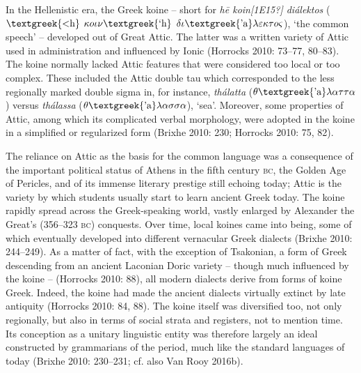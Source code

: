 \begin{styleStandard}
In the Hellenistic era, the Greek koine – short for \textit{h\=e koin[1E15?] diálektos} ($\text{\textgreek{<h}}$ $\kappa o\iota \nu \text{\textgreek{`h}}$ $\delta \iota \text{\textgreek{'a}}\lambda \varepsilon \kappa \tau o\varsigma $), ‘the common speech’ – developed out of Great Attic. The latter was a written variety of Attic used in administration and influenced by Ionic (Horrocks 2010: 73–77, 80–83). The koine normally lacked Attic features that were considered too local or too complex. These included the Attic double tau which corresponded to the less regionally marked double sigma in, for instance, \textit{thálatta }($\theta \text{\textgreek{'a}}\lambda \alpha \tau \tau \alpha $) versus \textit{thálassa }($\theta \text{\textgreek{'a}}\lambda \alpha \sigma \sigma \alpha $), ‘sea’. Moreover, some properties of Attic, among which its complicated verbal morphology, were adopted in the koine in a simplified or regularized form (Brixhe 2010: 230; Horrocks 2010: 75, 82).
\end{styleStandard}

\begin{styleStandard}
The reliance on Attic as the basis for the common language was a consequence of the important political status of Athens in the fifth century \textsc{bc}, the Golden Age of Pericles, and of its immense literary prestige still echoing today; Attic is the variety by which students usually start to learn ancient Greek today. The koine rapidly spread across the Greek-speaking world, vastly enlarged by Alexander the Great’s (356–323 \textsc{bc}) conquests. Over time, local koines came into being, some of which eventually developed into different vernacular Greek dialects (Brixhe 2010: 244–249). As a matter of fact, with the exception of Tsakonian, a form of Greek descending from an ancient Laconian Doric variety – though much influenced by the koine – (Horrocks 2010: 88), all modern dialects derive from forms of koine Greek. Indeed, the koine had made the ancient dialects virtually extinct by late antiquity (Horrocks 2010: 84, 88). The koine itself was diversified too, not only regionally, but also in terms of social strata and registers, not to mention time. Its conception as a unitary linguistic entity was therefore largely an ideal constructed by grammarians of the period, much like the standard languages of today (Brixhe 2010: 230–231; cf. also Van Rooy 2016b).
\end{styleStandard}

